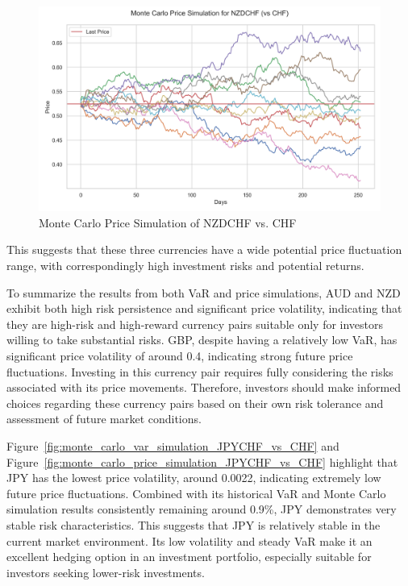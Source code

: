 \documentclass{article}
\begin{document}
\begin{figure}[h]
    \centering
    \includegraphics[width=0.75\linewidth]{reports/figures/monte_carlo_price_simulation_NZDCHF_vs_CHF.png}
    \caption{Monte Carlo Price Simulation of NZDCHF vs. CHF} \label{fig:monte_carlo_price_simulation_NZDCHF_vs_CHF}
\end{figure}
This suggests that these three currencies have a wide potential price fluctuation range, with correspondingly high investment risks and potential returns.

To summarize the results from both VaR and price simulations, AUD and NZD exhibit both high risk persistence and significant price volatility, indicating that they are high-risk and high-reward currency pairs suitable only for investors willing to take substantial risks. GBP, despite having a relatively low VaR, has significant price volatility of around 0.4, indicating strong future price fluctuations. Investing in this currency pair requires fully considering the risks associated with its price movements. Therefore, investors should make informed choices regarding these currency pairs based on their own risk tolerance and assessment of future market conditions.

Figure~\ref{fig:monte_carlo_var_simulation_JPYCHF_vs_CHF} and Figure~\ref{fig:monte_carlo_price_simulation_JPYCHF_vs_CHF} highlight that JPY has the lowest price volatility, around 0.0022, indicating extremely low future price fluctuations. Combined with its historical VaR and Monte Carlo simulation results consistently remaining around 0.9\%, JPY demonstrates very stable risk characteristics. This suggests that JPY is relatively stable in the current market environment. Its low volatility and steady VaR make it an excellent hedging option in an investment portfolio, especially suitable for investors seeking lower-risk investments.
\end{document}
